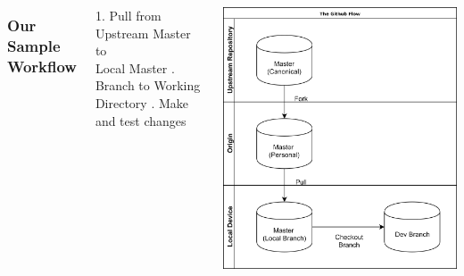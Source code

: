 \documentclass[unknownkeysallowed]{beamer}
\begin{document}
\begin{frame}
    \vspace{1cm}
	\begin{columns}
		\column{2.5in}
    \frametitle{Our Sample Workflow}
        1. Pull from Upstream Master to \\
        Local Master \linebreak{}. Branch to Working Directory \linebreak{}. Make and test changes \linebreak\linebreak
	\linebreak\linebreak
	\linebreak\linebreak
	\linebreak\linebreak
	\column{2.25in}
	\begin{center}
	\includegraphics[width = .9\linewidth]{assets/gitflow4}
	\end{center}
	\end{columns}
    \vspace{1cm}
\end{frame}
\end{document}

